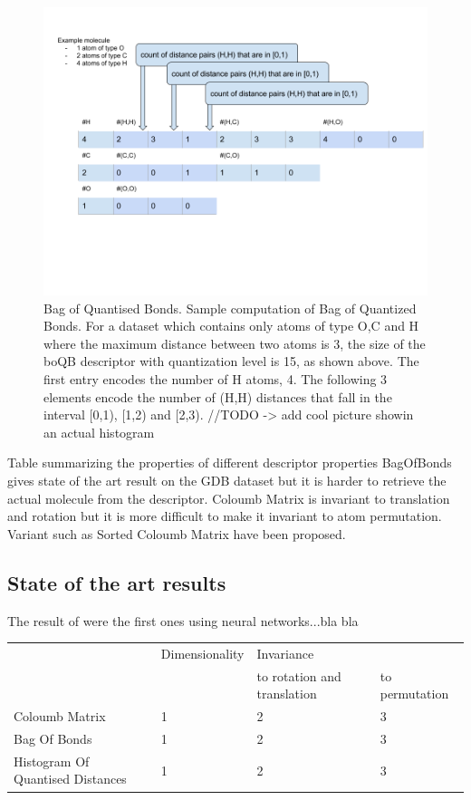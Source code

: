 \documentclass{article}
\begin{document}
\begin{figure}[h!]
\centering
\includegraphics[scale=0.5]{HistogramOfDistances.png}
\caption{Bag of Quantised Bonds.
Sample computation of Bag of Quantized Bonds. For a dataset which contains only atoms of type O,C and H where the maximum distance between two atoms is 3, the size of the boQB descriptor with quantization level is 15, as shown above. The first entry encodes the number of H atoms, 4. The following 3 elements encode the number of (H,H) distances that fall in the interval [0,1), [1,2) and [2,3).
//TODO -> add cool picture showin an actual histogram
}
\label{fig:univerise}
\end{figure}

Table summarizing the properties of different descriptor properties
BagOfBonds gives state of the art result on the GDB dataset
but it is harder to retrieve the actual molecule from the descriptor. Coloumb Matrix is invariant to translation and rotation but it is more difficult to make it invariant to atom permutation. Variant such as Sorted Coloumb Matrix have been proposed.

\subsection{State of the art results}
The result of \cite{montavon2012learning} were the first ones using neural networks...bla bla

\begin{tabular}{ l l l l }
& Dimensionality & Invariance  & \\ 
&  & to rotation and translation & to permutation \\ 
 Coloumb Matrix& 1& 2 & 3 \\
 Bag Of Bonds & 1& 2 & 3 \\
 Histogram Of Quantised Distances &1 & 2 & 3  \\
\end{tabular}
\end{document}
